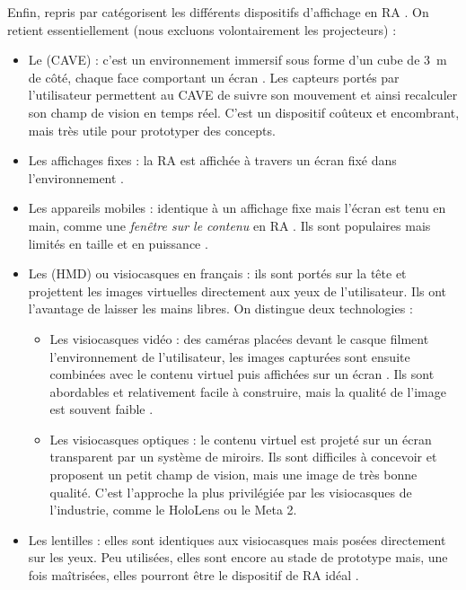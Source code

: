 Enfin, \cite{Buxton1998} repris par \cite{Bimber2005} catégorisent les différents dispositifs d'affichage en RA . On retient essentiellement (nous excluons volontairement les projecteurs) :
\begin{itemize}
  \item Le  (CAVE) : c'est un environnement immersif sous forme d'un cube de \SI{3}{\m} de côté, chaque face comportant un écran . Les capteurs portés par l'utilisateur permettent au CAVE de suivre son mouvement et ainsi recalculer son champ de vision en temps réel. C'est un dispositif coûteux et encombrant, mais très utile pour prototyper des concepts.
  \item Les affichages fixes : la RA est affichée à travers un écran fixé dans l'environnement .
  \item Les appareils mobiles : identique à un affichage fixe mais l'écran est tenu en main, comme une \emph{fenêtre sur le contenu} en RA . Ils sont populaires mais limités en taille et en puissance \citep{Huang2013}.
  \item Les  (HMD) ou visiocasques en français : ils sont portés sur la tête et projettent les images virtuelles directement aux yeux de l'utilisateur. Ils ont l'avantage de laisser les mains libres. On distingue deux technologies :
  \begin{itemize}
    \item Les visiocasques vidéo : des caméras placées devant le casque filment l'environnement de l'utilisateur, les images capturées sont ensuite combinées avec le contenu virtuel puis affichées sur un écran . Ils sont abordables et relativement facile à construire, mais la qualité de l'image est souvent faible \citep{Steptoe2013, Piumsomboon2014}.
    \item Les visiocasques optiques : le contenu virtuel est projeté sur un écran transparent par un système de miroirs. Ils sont difficiles à concevoir et proposent un petit champ de vision, mais une image de très bonne qualité. C'est l'approche la plus privilégiée par les visiocasques de l'industrie, comme le HoloLens ou le Meta 2.
  \end{itemize}
  \item Les lentilles : elles sont identiques aux visiocasques mais posées directement sur les yeux. Peu utilisées, elles sont encore au stade de prototype mais, une fois maîtrisées, elles pourront être le dispositif de RA idéal \citep{VanKrevelen2010}.
\end{itemize}
\medskip

